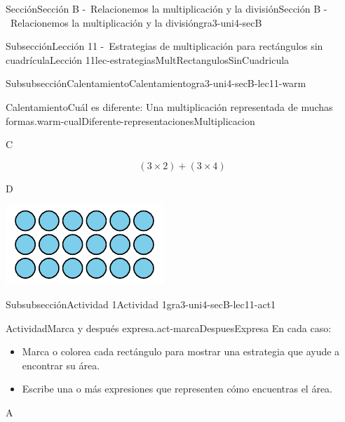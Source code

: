 \documentclass[twoside,10pt,]{article}
\begin{document}
\begin{sectionptx}{Sección}{Sección B -~Relacionemos la multiplicación y la división}{}{Sección B -~Relacionemos la multiplicación y la división}{}{}{gra3-uni4-secB}
\begin{subsectionptx}{Subsección}{Lección 11 -~Estrategias de multiplicación para rectángulos sin cuadrícula}{}{Lección 11}{}{}{lec-estrategiasMultRectangulosSinCuadricula}
\begin{subsubsectionptx}{Subsubsección}{Calentamiento}{}{Calentamiento}{}{}{gra3-uni4-secB-lec11-warm}
\begin{exploration}{Calentamiento}{Cuál es diferente: Una multiplicación representada de muchas formas.}{warm-cualDiferente-representacionesMultiplicacion}
\begin{sidebyside}{2}{0.05}{0.05}{0.1}
\begin{sbspanel}{0.4}
\end{sbspanel}%
\end{sidebyside}%
\begin{sidebyside}{2}{0.05}{0.05}{0.1}%
\begin{sbspanel}{0.4}%
C%
\par
%
\begin{equation*}
(3\times 2) + (3\times 4)
\end{equation*}
%
\end{sbspanel}%
\begin{sbspanel}{0.4}%
D%
\par
\includegraphics[width=\linewidth]{external/svg-source/tikz-file-153083.pdf}
\end{sbspanel}%
\end{sidebyside}%
\end{exploration}%
\end{subsubsectionptx}
%
%
\typeout{************************************************}
\typeout{************************************************}
%
\begin{subsubsectionptx}{Subsubsección}{Actividad 1}{}{Actividad 1}{}{}{gra3-uni4-secB-lec11-act1}
\begin{activity}{Actividad}{Marca y después expresa.}{act-marcaDespuesExpresa}%
En cada caso:%
%
\begin{itemize}[label=\textbullet]
\item{}Marca o colorea cada rectángulo para mostrar una estrategia que ayude a encontrar su área.%
\item{}Escribe una o más expresiones que representen cómo encuentras el área.%
\end{itemize}
\begin{sidebyside}{3}{0}{0}{0}%
\begin{sbspanel}{0.391}%
A%
\par

\end{sbspanel}
\end{sidebyside}
\end{activity}
\end{subsubsectionptx}
\end{subsectionptx}
\end{sectionptx}
\end{document}
